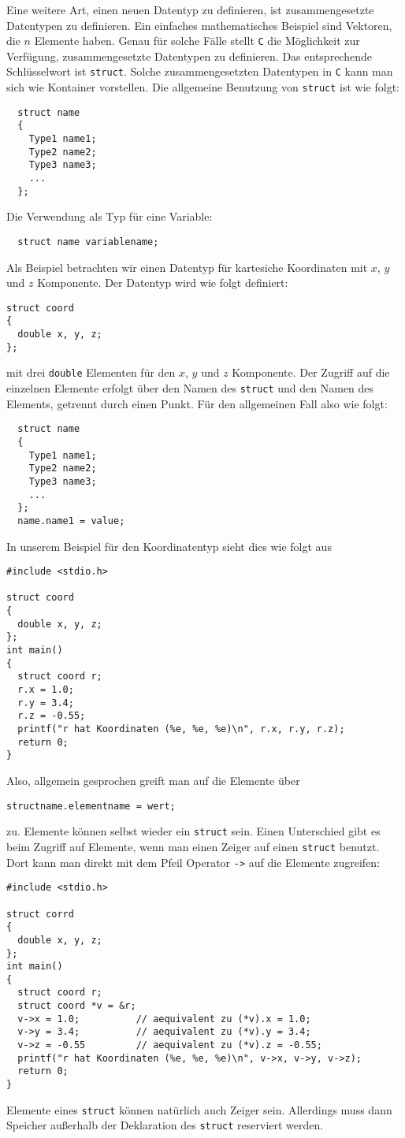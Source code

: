 Eine weitere Art, einen neuen Datentyp zu definieren, ist zusammengesetzte Datentypen zu definieren.
Ein einfaches mathematisches Beispiel sind Vektoren, die $n$ Elemente haben.
Genau für solche Fälle stellt \texttt{C} die Möglichkeit zur Verfügung, zusammengesetzte Datentypen zu definieren.
Das entsprechende Schlüsselwort ist \verb|struct|.
Solche zusammengesetzten Datentypen in \texttt{C} kann man sich wie Kontainer vorstellen.
Die allgemeine Benutzung von \verb|struct| ist wie folgt:
\begin{lstlisting}
  struct name
  {
    Type1 name1;
    Type2 name2;
    Type3 name3;
    ...
  };
\end{lstlisting}
Die Verwendung als Typ für eine Variable:
\begin{lstlisting}
  struct name variablename;
\end{lstlisting}
Als Beispiel betrachten wir einen Datentyp für kartesiche Koordinaten mit $x$, $y$ und $z$ Komponente.
Der Datentyp wird wie folgt definiert:
\begin{lstlisting}
struct coord
{
  double x, y, z;
};
\end{lstlisting}
mit drei \verb|double| Elementen für den $x$, $y$ und $z$ Komponente.
Der Zugriff auf die einzelnen Elemente erfolgt über den Namen des \verb|struct| und den Namen des Elements, getrennt durch einen Punkt.
Für den allgemeinen Fall also wie folgt:
\begin{lstlisting}
  struct name
  {
    Type1 name1;
    Type2 name2;
    Type3 name3;
    ...
  };
  name.name1 = value;
\end{lstlisting}
In unserem Beispiel für den Koordinatentyp sieht dies wie folgt aus
\begin{lstlisting}
#include <stdio.h>

struct coord
{
  double x, y, z;
};
int main()
{
  struct coord r;
  r.x = 1.0;
  r.y = 3.4;
  r.z = -0.55;
  printf("r hat Koordinaten (%e, %e, %e)\n", r.x, r.y, r.z);
  return 0;
}
\end{lstlisting}
Also, allgemein gesprochen greift man auf die Elemente über 
\begin{lstlisting}
structname.elementname = wert;
\end{lstlisting}
zu.
Elemente können selbst wieder ein \verb|struct| sein.
Einen Unterschied gibt es beim Zugriff auf Elemente, wenn man einen Zeiger auf einen \verb|struct| benutzt.
Dort kann man direkt mit dem Pfeil Operator \verb|->| auf die Elemente zugreifen:
\begin{lstlisting}
#include <stdio.h>

struct corrd
{
  double x, y, z;
};
int main()
{
  struct coord r;
  struct coord *v = &r;
  v->x = 1.0;          // aequivalent zu (*v).x = 1.0;
  v->y = 3.4;          // aequivalent zu (*v).y = 3.4;
  v->z = -0.55         // aequivalent zu (*v).z = -0.55;
  printf("r hat Koordinaten (%e, %e, %e)\n", v->x, v->y, v->z);
  return 0;
}
\end{lstlisting}
Elemente eines \verb|struct| können natürlich auch Zeiger sein.
Allerdings muss dann Speicher außerhalb der Deklaration des \texttt{struct} reserviert werden.

